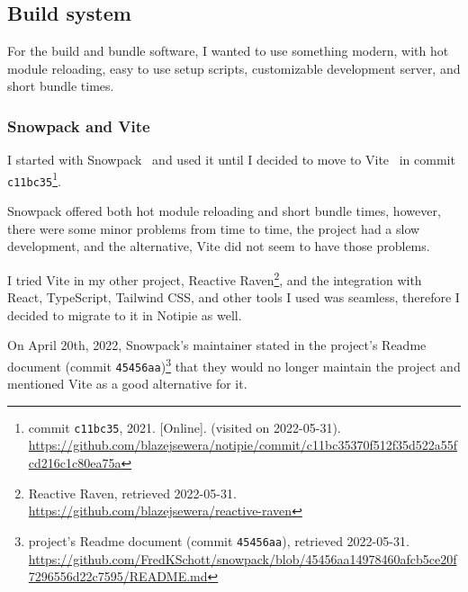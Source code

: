\subsection{Build system}\label{build-system}

For the build and bundle software,
I wanted to use something modern,
with hot module reloading,
easy to use setup scripts,
customizable development server,
and short bundle times.

\subsubsection{Snowpack and Vite}\label{snowpack-and-vite}

I started with Snowpack~\cite{schott_snowpack_2021}
and used it until I decided to move to Vite~\cite{you_vite_2022}
in commit \texttt{c11bc35}\footnote{
  commit \texttt{c11bc35}, 2021.
    [Online]. (visited on 2022-05-31).
  \url{https://github.com/blazejsewera/notipie/commit/c11bc35370f512f35d522a55fcd216c1c80ea75a}
}.

Snowpack offered both hot module reloading and short bundle times,
however, there were some minor problems from time to time, the project
had a slow development, and the alternative, Vite did not seem to have
those problems.

I tried Vite in my other project, Reactive Raven\footnote{Reactive
  Raven, retrieved 2022-05-31.
  \url{https://github.com/blazejsewera/reactive-raven}}, and the
integration with React, TypeScript, Tailwind CSS, and other tools I used
was seamless, therefore I decided to migrate to it in Notipie as well.

On April 20th, 2022, Snowpack's maintainer stated in the project's
Readme document (commit \texttt{45456aa})\footnote{project's Readme
  document (commit \texttt{45456aa}), retrieved 2022-05-31.
  \url{https://github.com/FredKSchott/snowpack/blob/45456aa14978460afcb5ce20f7296556d22c7595/README.md}}
that they would no longer maintain the project and mentioned Vite as a
good alternative for it.
